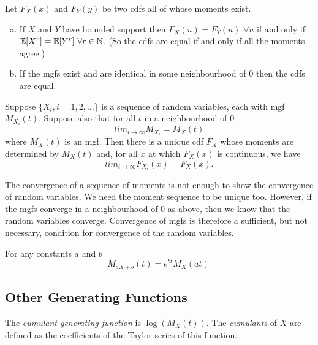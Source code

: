 \begin{theorem}
    Let $F_X(x)$ and $F_Y(y)$ be two cdfs all of whose moments exist.
    \begin{enumerate}[a.]
        \item If $X$ and $Y$ have bounded support then $F_X(u) = F_Y(u) \,\, \forall u$ if and only if $\mathbb{E}{}[X^r] = \mathbb{E}{}[Y^r] \,\, \forall r \in \mathbb{N}$. (So the cdfs are equal if and only if all the moments agree.)
        \item If the mgfs exist and are identical in some neighbourhood of 0 then the cdfs are equal.
    \end{enumerate}
\end{theorem}

\begin{theorem}
    Suppose $\{X_i, i=1, 2, \dots$\} is a sequence of random variables, each with mgf $M_{X_i}(t)$. Suppose also that for all $t$ in a neighbourhood of 0
    \[
        lim_{i \to  \infty} M_{X_i} = M_X(t) 
    \]
    where $M_X(t)$ is an mgf. Then there is a unique cdf $F_X$ whose moments are determined by $M_X(t)$ and, for all $x$ at which $F_X(x)$ is continuous, we have
    \[
        lim_{i\to\infty} F_{X_i}(x) = F_X(x).
    \]
\end{theorem}  

\begin{remark}
    The convergence of a sequence of moments is not enough to show the convergence of random variables. We need the moment sequence to be unique too. However, if the mgfs converge in a neighbourhood of 0 as above, then we know that the random variables converge. Convergence of mgfs is therefore a sufficient, but not necessary, condition for convergence of the random variables.
\end{remark}

\begin{theorem}
    For any constants $a$ and $b$
    \[
        M_{aX + b}(t) = e^{bt}M_X(at)\
    \]
\end{theorem}

\subsection{Other Generating Functions}

\begin{definition}
    The \emph{cumulant generating function} is $\log(M_X(t))$. The \emph{cumulants} of $X$ are defined as the coefficients of the Taylor series of this function.
\end{definition}

